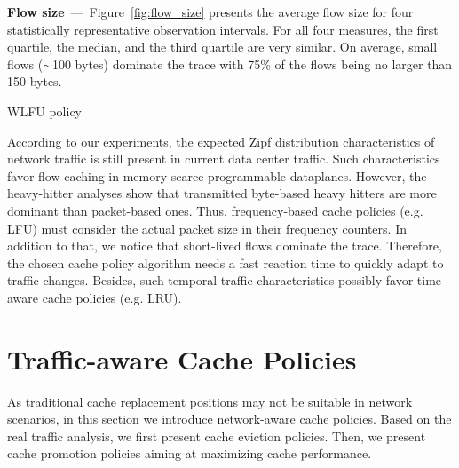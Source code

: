 \textbf{Flow size}~---~Figure~\ref{fig:flow_size} presents the average flow size for four statistically representative observation intervals.
For all four measures, the first quartile, the median, and the third quartile are very similar.
On average, small flows ($\sim$100 bytes) dominate the trace with 75\% of the flows being no larger than 150 bytes.
\begin{algorithm}[t]
	\caption{WLFU policy}
	\label{algo:wlfu}
	\SetInd{0.1em}{.9em}
	\SetAlgoLined
	\footnotesize
\end{algorithm}

According to our experiments, the expected Zipf distribution characteristics of network traffic is still present in current data center traffic.
Such characteristics favor flow caching in memory scarce programmable dataplanes.
However, the heavy-hitter analyses show that transmitted byte-based heavy hitters are more dominant than packet-based ones.
Thus, frequency-based cache policies (e.g. LFU) must consider the actual packet size in their frequency counters.
In addition to that, we notice that short-lived flows dominate the trace.
Therefore, the chosen cache policy algorithm needs a fast reaction time to quickly adapt to traffic changes.
Besides, such temporal traffic characteristics possibly favor time-aware cache policies (e.g. LRU).

\section{Traffic-aware Cache Policies}\label{sec:policies}
As traditional cache replacement positions may not be suitable in network scenarios, in this section we introduce network-aware cache policies.
Based on the real traffic analysis, we first present cache eviction policies.
Then, we present cache promotion policies aiming at maximizing cache performance.

